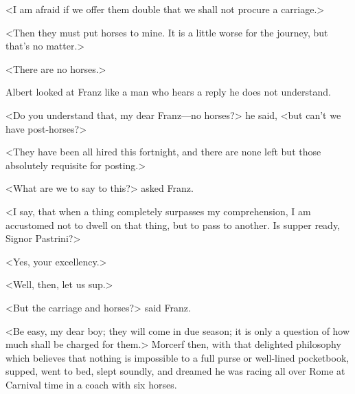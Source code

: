  <I am afraid if we offer them double that we shall not procure a carriage.> 

 <Then they must put horses to mine. It is a little worse for the journey, but that's no matter.> 

 <There are no horses.> 

 Albert looked at Franz like a man who hears a reply he does not understand. 

 <Do you understand that, my dear Franz—no horses?> he said, <but can't we have post-horses?> 

 <They have been all hired this fortnight, and there are none left but those absolutely requisite for posting.> 

 <What are we to say to this?> asked Franz. 

 <I say, that when a thing completely surpasses my comprehension, I am accustomed not to dwell on that thing, but to pass to another. Is supper ready, Signor Pastrini?> 

 <Yes, your excellency.> 

 <Well, then, let us sup.> 

 <But the carriage and horses?> said Franz. 

 <Be easy, my dear boy; they will come in due season; it is only a question of how much shall be charged for them.> Morcerf then, with that delighted philosophy which believes that nothing is impossible to a full purse or well-lined pocketbook, supped, went to bed, slept soundly, and dreamed he was racing all over Rome at Carnival time in a coach with six horses. 